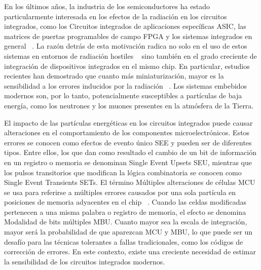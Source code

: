 En los últimos años, la industria de los semiconductores ha estado particularmente interesada en los efectos de la radiación en los circuitos integrados, como los Circuitos integrados de aplicaciones específicas ASIC, las matrices de puertas programables de campo FPGA y los sistemas integrados en general ~\cite{Velazco2007}.
La razón detrás de esta motivación radica no solo en el uso de estos sistemas en entornos de radiación hostiles ~\cite{Dixit2011} sino también en el grado creciente de integración de dispositivos integrados en el mismo chip.
En particular, estudios recientes han demostrado que cuanto más miniaturización, mayor es la sensibilidad a los errores inducidos por la radiación ~\cite{Ibe2010}.
Los sistemas embebidos modernos son, por lo tanto, potencialmente susceptibles a partículas de baja energía, como los neutrones y los muones presentes en la atmósfera de la Tierra.

El impacto de las partículas energéticas en los circuitos integrados puede causar alteraciones en el comportamiento de los componentes microelectrónicos.
Estos errores se conocen como efectos de evento único SEE y pueden ser de diferentes tipos.
Entre ellos, los que dan como resultado el cambio de un bit de información en un registro o memoria se denominan Single Event Upsets SEU, mientras que los pulsos transitorios que modifican la lógica combinatoria se conocen como Single Event Transients SETs.
El término Múltiples alteraciones de células MCU se usa para referirse a múltiples errores causados por una sola partícula en posiciones de memoria adyacentes en el chip ~\cite{Quinn2007}.
Cuando las celdas modificadas pertenecen a una misma palabra o registro de memoria, el efecto se denomina Modalidad de bits múltiples MBU.
Cuanto mayor sea la escala de integración, mayor será la probabilidad de que aparezcan MCU y MBU, lo que puede ser un desafío para las técnicas tolerantes a fallas tradicionales, como los códigos de corrección de errores.
En este contexto, existe una creciente necesidad de estimar la sensibilidad de los circuitos integrados modernos.

